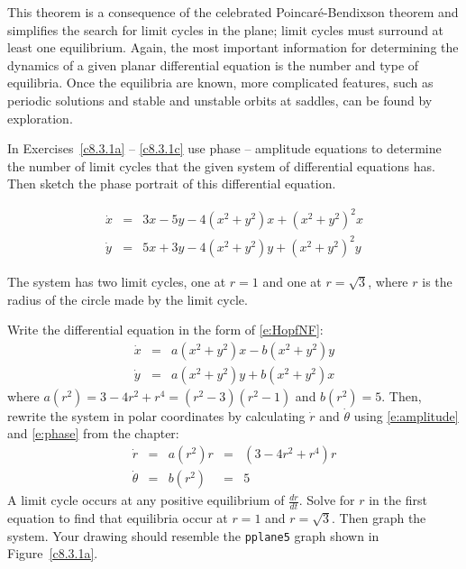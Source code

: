 \documentclass{ximera}
\begin{document}
This theorem is a consequence of the celebrated Poincar\'e-Bendixson theorem
 and simplifies the search for limit 
cycles in the plane; limit cycles must surround at least one equilibrium.  
Again, the most important information for determining the dynamics of a given 
planar differential equation is the number and type of equilibria.  Once the 
equilibria are known, more complicated features, such as periodic 
solutions and stable and unstable orbits at saddles, can be found by 
exploration.

\EXER

\TEXER

\noindent In Exercises~\ref{c8.3.1a} -- \ref{c8.3.1c} use phase -- amplitude 
equations to determine the number of limit cycles that the given system of 
differential equations has.   Then sketch the phase portrait of this 
differential equation.
\begin{exercise} \label{c8.3.1a}
\[
\begin{array}{rcl}
\dot{x} & = &  3x-5y - 4(x^2+y^2)x + (x^2+y^2)^2x\\
\dot{y} & = &  5x+3y - 4(x^2+y^2)y + (x^2+y^2)^2y
\end{array} 
\]

\begin{solution}

\ans The system has two limit cycles, one at $r = 1$ and one at $r =
\sqrt{3}$, where $r$ is the radius of the circle made by the limit cycle.

\soln Write the differential equation in the form of \eqref{e:HopfNF}:
\[ \begin{array}{rcl}
\dot{x} & = & a(x^2 + y^2)x - b(x^2 + y^2)y \\
\dot{y} & = & a(x^2 + y^2)y + b(x^2 + y^2)x \end{array}
\]
where $a(r^2) = 3 - 4r^2 + r^4=(r^2-3)(r^2-1)$ and $b(r^2) = 5$.  Then,
rewrite the system in polar coordinates by calculating $\dot{r}$ and
$\dot{\theta}$ using \eqref{e:amplitude} and \eqref{e:phase} from the
chapter:
\[ \begin{array}{rcccl}
\dot{r} & = & a(r^2)r & = & (3 - 4r^2 + r^4)r \\
\dot{\theta} & = & b(r^2) & = & 5 \end{array}
\]
A limit cycle occurs at any positive equilibrium of $\frac{dr}{dt}$.
Solve for $r$ in the first equation to find that equilibria occur
at $r = 1$ and $r = \sqrt{3}$.  Then graph the system.  Your drawing
should resemble the {\tt pplane5} graph shown in Figure~\ref{c8.3.1a}.

\begin{figure}[htb]
                       \centerline{%
                       }
\end{figure}


\end{solution}
\end{exercise}
\end{document}
